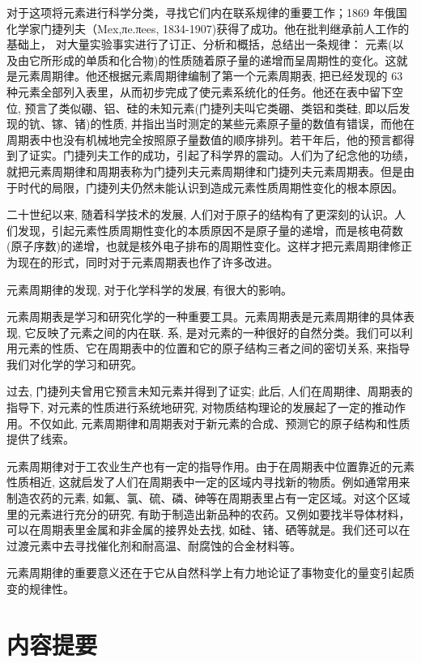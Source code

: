 \documentclass[10pt]{article}
\begin{document}
对于这项将元素进行科学分类，寻找它们内在联系规律的重要工作；1869 年俄国化学家门捷列夫（Mex,πe.πees, 1834-1907)获得了成功。他在批判继承前人工作的基础上， 对大量实验事实进行了订正、分析和概括，总结出一条规律： 元素(以及由它所形成的单质和化合物)的性质随着原子量的递增而呈周期性的变化。这就是元素周期律。他还根据元素周期律编制了第一个元素周期表, 把已经发现的 63 种元素全部列入表里，从而初步完成了使元素系统化的任务。他还在表中留下空位, 预言了类似硼、铝、硅的未知元素(门捷列夫叫它类硼、类铝和类硅, 即以后发现的钪、镓、锗)的性质, 并指出当时测定的某些元素原子量的数值有错误，而他在周期表中也没有机械地完全按照原子量数值的顺序排列。若干年后，他的预言都得到了证实。门捷列夫工作的成功，引起了科学界的震动。人们为了纪念他的功绩，就把元素周期律和周期表称为门捷列夫元素周期律和门捷列夫元素周期表。但是由于时代的局限，门捷列夫仍然未能认识到造成元素性质周期性变化的根本原因。

二十世纪以来, 随着科学技术的发展, 人们对于原子的结构有了更深刻的认识。人们发现，引起元素性质周期性变化的本质原因不是原子量的递增，而是核电荷数(原子序数)的递增，也就是核外电子排布的周期性变化。这样才把元素周期律修正为现在的形式，同时对于元素周期表也作了许多改进。

元素周期律的发现, 对于化学科学的发展, 有很大的影响。

元素周期表是学习和研究化学的一种重要工具。元素周期表是元素周期律的具体表现, 它反映了元素之间的内在联. 系, 是对元素的一种很好的自然分类。我们可以利用元素的性质、它在周期表中的位置和它的原子结构三者之间的密切关系, 来指导我们对化学的学习和研究。

过去, 门捷列夫曾用它预言未知元素并得到了证实; 此后, 人们在周期律、周期表的指导下, 对元素的性质进行系统地研究, 对物质结构理论的发展起了一定的推动作用。不仅如此, 元素周期律和周期表对于新元素的合成、预测它的原子结构和性质提供了线索。

元素周期律对于工农业生产也有一定的指导作用。由于在周期表中位置靠近的元素性质相近, 这就启发了人们在周期表中一定的区域内寻找新的物质。例如通常用来制造农药的元素, 如氟、氯、硫、磷、砷等在周期表里占有一定区域。对这个区域里的元素进行充分的研究, 有助于制造出新品种的农药。又例如要找半导体材料，可以在周期表里金属和非金属的接界处去找, 如硅、锗、硒等就是。我们还可以在过渡元素中去寻找催化剂和耐高温、耐腐蚀的合金材料等。

元素周期律的重要意义还在于它从自然科学上有力地论证了事物变化的量变引起质变的规律性。

\section*{内容提要}
\end{document}
